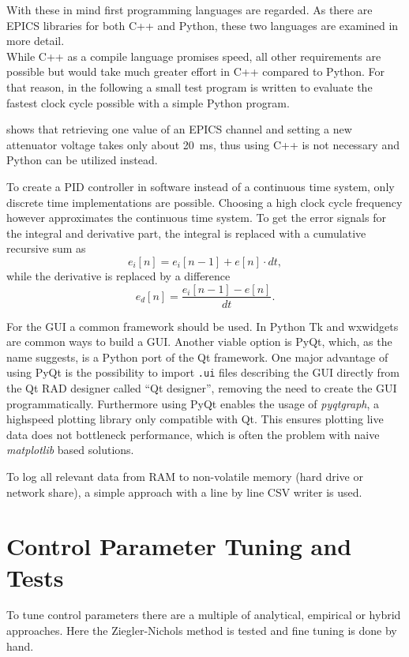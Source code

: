 With these in mind first programming languages are regarded. As there are EPICS libraries for both C++ and Python, these two languages are examined in more detail.\\
While C++ as a compile language promises speed, all other requirements are possible but would take much greater effort in C++ compared to Python. For that reason, in the following a small test program is written to evaluate the fastest clock cycle possible with a simple Python program.

 shows that retrieving one value of an EPICS channel and setting a new attenuator voltage takes only about \SI{20}{\milli\second}, thus using C++ is not necessary and Python can be utilized instead.
 
To create a PID controller in software instead of a continuous time system, only discrete time implementations are possible. Choosing a high clock cycle frequency however approximates the continuous time system. To get the error signals for the integral and derivative part, the integral is replaced with a cumulative recursive sum as
\begin{equation}
e_i[n]=e_i[n-1]+e[n] \cdot dt,
\end{equation}
while the derivative is replaced by a difference
\begin{equation}
e_d[n]=\frac{e_i[n-1]-e[n]}{dt}.
\end{equation}

For the GUI a common framework should be used. In Python Tk and wxwidgets are common ways to build a GUI. Another viable option is PyQt, which, as the name suggests, is a Python port of the Qt framework. One major advantage of using PyQt is the possibility to import \texttt{.ui} files describing the GUI directly from the Qt RAD designer called ``Qt designer'', removing the need to create the GUI programmatically. Furthermore using PyQt enables the usage of \textit{pyqtgraph}, a highspeed plotting library only compatible with Qt. This ensures plotting live data does not bottleneck performance, which is often the problem with naive \textit{matplotlib} based solutions.

To log all relevant data from RAM to non-volatile memory (hard drive or network share), a simple approach with a line by line CSV writer is used.


\FloatBarrier
\section{Control Parameter Tuning and Tests}
To tune control parameters there are a multiple of analytical, empirical or hybrid approaches. Here the Ziegler-Nichols method is tested and fine tuning is done by hand.

